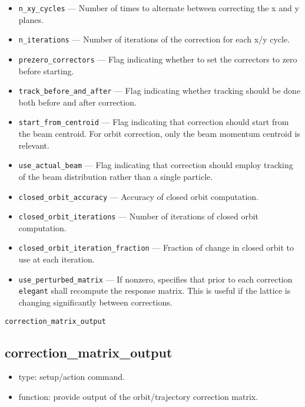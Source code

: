 \documentclass[11pt]{article}
\begin{document}
\begin{itemize}
matrix should be computed and used.  This will improve convergence but isn't always needed.
\item \verb|n_xy_cycles| --- Number of times to alternate between correcting the x and y planes.
\item \verb|n_iterations| --- Number of iterations of the correction for each x/y cycle.
\item \verb|prezero_correctors| --- Flag indicating whether to set the correctors to zero before starting.
\item \verb|track_before_and_after| --- Flag indicating whether tracking should be done both before and after
correction.
\item \verb|start_from_centroid| --- Flag indicating that correction
should start from the beam centroid.  For orbit correction, only the
beam momentum centroid is relevant.
\item \verb|use_actual_beam| --- Flag indicating that correction
should employ tracking of the beam distribution rather than a single
particle.
\item \verb|closed_orbit_accuracy| --- Accuracy of closed orbit computation.
\item \verb|closed_orbit_iterations| --- Number of iterations of closed orbit computation.
\item \verb|closed_orbit_iteration_fraction| --- Fraction of change in closed orbit to
use at each iteration.
\item \verb|use_perturbed_matrix| --- If nonzero, specifies that prior to each 
	correction \verb|elegant| shall recompute the response matrix.  This
	is useful if the lattice is changing significantly between corrections.
\end{itemize}

\begin{latexonly}
\newpage
\begin{center}{\Large\verb|correction_matrix_output|}\end{center}
\end{latexonly}
\subsection{correction\_matrix\_output}

\begin{itemize}
\item type: setup/action command.
\item function: provide output of the orbit/trajectory correction matrix.
\end{itemize}
\end{document}
